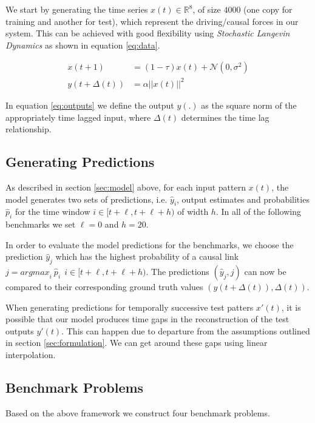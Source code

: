\documentclass[envcountsect,runningheads]{llncs}
\theoremstyle{etoile}
\begin{document}
We start by generating the time series $x(t) \in \mathbb{R}^8$, of size $4000$ 
(one copy for training and another for test), which represent the driving/causal forces in our system. 
This can be achieved with good flexibility using \emph{Stochastic Langevin Dynamics} as shown in 
equation \ref{eq:data}.

\begin{align}
 x(t+1) &= (1 - \tau) x(t) + \mathcal{N}(0, \sigma^2) \label{eq:data}\\
 y(t+\Delta(t)) &= \alpha ||x(t)||^2 \label{eq:outputs}
\end{align}

In equation \ref{eq:outputs} we define the output $y(.)$ as the square norm of the appropriately 
time lagged input, where $\Delta(t)$ determines the time lag relationship.

\subsection{Generating Predictions}

As described in section \ref{sec:model} above, for each input pattern $x(t)$, the model 
generates two sets of predictions, i.e. ${\hat{y}_i}$, output estimates and probabilities $\hat{p}_i$ 
for the time window $i \in [t+\ell, t+\ell+h)$ of width $h$. In all of the following benchmarks we set 
$\ell = 0$ and $h = 20$.

In order to evaluate the model predictions for the benchmarks, we choose the prediction $\hat{y}_j$ 
which has the highest probability of a causal link $j = {argmax}_{i} \ \hat{p}_i \ \ i \in [t+\ell, t+\ell+h)$. 
The predictions $(\hat{y}_j, j)$ can now be compared to their corresponding ground truth values 
$(y(t + \Delta(t)), \Delta(t))$. 

When generating predictions for temporally successive test patters $x'(t)$, it is possible that our 
model produces time gaps in the reconstruction of the test outputs $y'(t)$. This can happen due to 
departure from the assumptions outlined in section \ref{sec:formulation}. We can get around these 
gaps using linear interpolation.


\subsection{Benchmark Problems}\label{sec:benchmark}

Based on the above framework we construct four benchmark problems.
\end{document}
